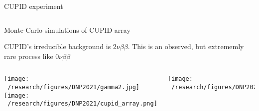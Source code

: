 \documentclass[final]{beamer}
\newlength{\colwidth}
\begin{document}
\begin{frame}[t]
\begin{columns}[t]
\begin{column}{\colwidth}
\begin{block}{CUPID experiment}
\begin{columns}[c]
      \column{.4\colwidth} %
        \begin{center}
        \end{center}
      
    \end{columns}


  \end{block}

  \begin{block}{Monte-Carlo simulations of CUPID array}

    CUPID's irreducible background is $2\nu\beta\beta$. This is an observed, but extrememly rare process like $0\nu\beta\beta$
    \vspace{2cm}
    \begin{columns}[c] %
      
      \column{.5\colwidth} %
      \texttt{[image: ~/research/figures/DNP2021/gamma2.jpg]}
      \texttt{[image: ~/research/figures/DNP2021/cupid\_array.png]}
      
      \column{.5\colwidth} %
      \texttt{[image: ~/research/figures/DNP2021/u238.jpg]}
      
    \end{columns}


  \end{block}

  


\end{column}
\end{columns}
\end{frame}
\end{document}

